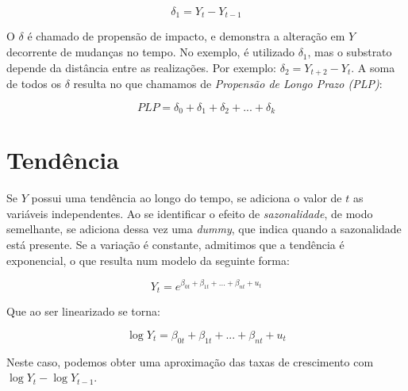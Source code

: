 \documentclass[12pt,a4paper,oneside,brazil]{abntex2}
\begin{document}
\begin{equation}
\delta_1 = Y_t - Y_{t-1} 
\end{equation}

O $\delta$ é chamado de propensão de impacto, e demonstra a alteração em $Y$ decorrente de mudanças no tempo. No exemplo, é utilizado $\delta_1$, mas o substrato depende da distância entre as realizações. Por exemplo: $\delta_2 = Y_{t+2} - Y_{t}$. A soma de todos os $\delta$ resulta no que chamamos de \emph{Propensão de Longo Prazo (PLP)}:

\begin{equation}
    PLP = \delta_0 + \delta_1 + \delta_2 + ... + \delta_k
\end{equation}

\section{Tendência}

Se $Y$ possui uma tendência ao longo do tempo, se adiciona o valor de $t$ as variáveis independentes. Ao se identificar o efeito de \emph{sazonalidade}, de modo semelhante, se adiciona dessa vez uma \emph{dummy}, que indica quando a sazonalidade está presente. Se a variação é constante, admitimos que a tendência é exponencial, o que resulta num modelo da seguinte forma:

\begin{equation}
    Y_t = e^{\beta_{0t} + \beta_{1t} + ... + \beta_{nt} + u_t}
\end{equation}

Que ao ser linearizado se torna:

\begin{equation}
    \log{Y_t} = \beta_{0t} + \beta_{1t} + ... + \beta_{nt} + u_t
\end{equation}

Neste caso, podemos obter uma aproximação das taxas de crescimento com $\log{Y_t} - \log{Y_{t-1}}$.
\end{document}
